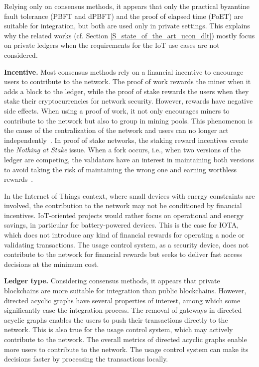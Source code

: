 Relying only on consensus methods, it appears that only the practical byzantine fault tolerance (PBFT and dPBFT) and the proof of elapsed time (PoET) are suitable for integration, but both are used only in private settings. This explains why the related works (cf. Section \ref{S_state_of_the_art_ucon_dlt}) mostly focus on private ledgers when the requirements for the IoT use cases are not considered. 

\textbf{Incentive.}
Most consensus methods rely on a financial incentive to encourage users to contribute to the network. The proof of work rewards the miner when it adds a block to the ledger, while the proof of stake rewards the users when they stake their cryptocurrencies for network security. However, rewards have negative side effects. When using a proof of work, it not only encourages miners to contribute to the network but also to group in mining pools. This phenomenon is the cause of the centralization of the network and users can no longer act independently~\cite{Ketsdever2019}. In proof of stake networks, the staking reward incentives create the \emph{Nothing at Stake} issue. 
When a fork occurs, i.e., when two versions of the ledger are competing, the validators have an interest in maintaining both versions to avoid taking the risk of maintaining the wrong one and earning worthless rewards~\cite{Ketsdever2019}. 

In the Internet of Things context, where small devices with energy constraints are involved, the contribution to the network may not be conditioned by financial incentives. IoT-oriented projects would rather focus on operational and energy savings, in particular for battery-powered devices. This is the case for IOTA, which does not introduce any kind of financial rewards for operating a node or validating transactions. The usage control system, as a security device, does not contribute to the network for financial rewards but seeks to deliver fast access decisions at the minimum cost.

\textbf{Ledger type.} Considering consensus methods, it appears that private blockchains are more suitable for integration than public blockchains. However, directed acyclic graphs have several properties of interest, among which some significantly ease the integration process. The removal of gateways in directed acyclic graphs enables the users to push their transactions directly to the network. This is also true for the usage control system, which may actively contribute to the network. The overall metrics of directed acyclic graphs enable more users to contribute to the network. The usage control system can make its decisions faster by processing the transactions locally.
 
